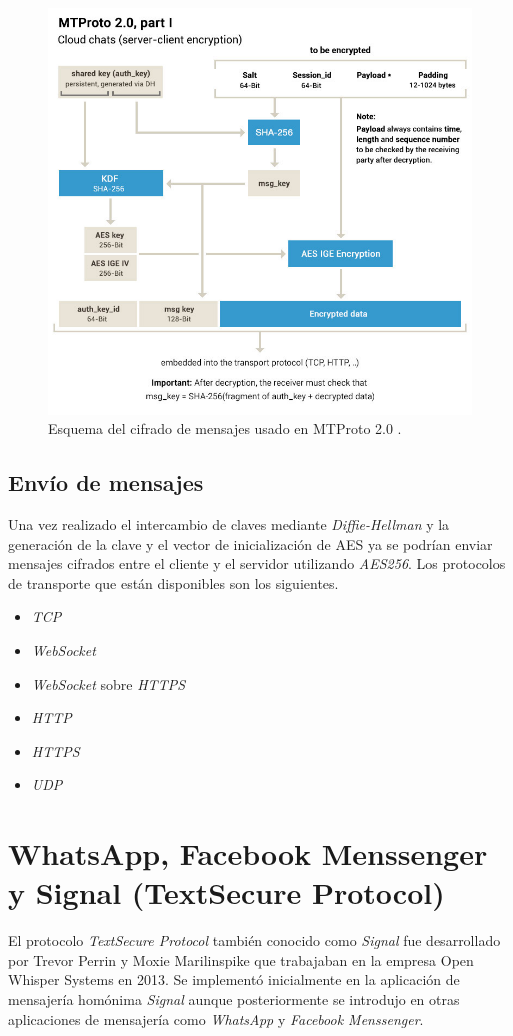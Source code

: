 \begin{figure}[htb]
	\centering
	\includegraphics[scale=0.4]{imagenes/diagramaMTProto.jpg} 
	\caption{Esquema del cifrado de mensajes usado en MTProto 2.0 \cite{WebProto}.}
	\label{mtproto2}
\end{figure}

\subsection{Envío de mensajes}
Una vez realizado el intercambio de claves mediante \emph{Diffie-Hellman} y la generación de la clave y el vector de inicialización de AES ya se podrían enviar mensajes cifrados entre el cliente y el servidor utilizando \emph{AES256}.
Los protocolos de transporte que están disponibles son los siguientes.
\begin{itemize}
	\item \emph{TCP}
	\item \emph{WebSocket}
	\item \emph{WebSocket} sobre \emph{HTTPS}
	\item \emph{HTTP}
	\item \emph{HTTPS}
	\item \emph{UDP}
\end{itemize}


\section{WhatsApp, Facebook Menssenger y Signal (TextSecure Protocol)}
El protocolo \emph{TextSecure Protocol} también conocido como \emph{Signal} fue desarrollado por Trevor Perrin y Moxie Marilinspike que trabajaban en la empresa Open Whisper Systems en 2013. Se implementó inicialmente en la aplicación de mensajería homónima \emph{Signal} aunque posteriormente se introdujo en otras aplicaciones de mensajería como \emph{WhatsApp} y \emph{Facebook Menssenger}.

